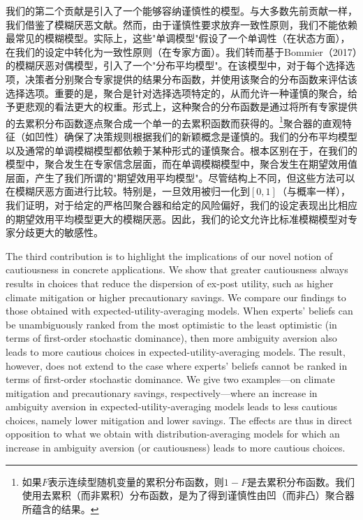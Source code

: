 \documentclass[12pt,a4paper]{article}
\newenvironment{original}
  {\par\noindent\ignorespaces}
  {\par}
\newenvironment{translation}
  {\par\noindent{\color{transblue}\ignorespaces}}
  {\par\medskip}
\begin{document}
\begin{translation}
我们的第二个贡献是引入了一个能够容纳谨慎性的模型。与大多数先前贡献一样，我们借鉴了模糊厌恶文献。然而，由于谨慎性要求放弃一致性原则，我们不能依赖最常见的模糊模型。实际上，这些"单调模型"假设了一个单调性（在状态方面），在我们的设定中转化为一致性原则（在专家方面）。我们转而基于Bommier（2017）的模糊厌恶对偶模型，引入了一个"分布平均模型"。在该模型中，对于每个选择选项，决策者分别聚合专家提供的结果分布函数，并使用该聚合的分布函数来评估该选择选项。重要的是，聚合是针对选择选项特定的，从而允许一种谨慎的聚合，给予更悲观的看法更大的权重。形式上，这种聚合的分布函数是通过将所有专家提供的去累积分布函数逐点聚合成一个单一的去累积函数而获得的。\footnote{如果$F$表示连续型随机变量的累积分布函数，则$1-F$是去累积分布函数。我们使用去累积（而非累积）分布函数，是为了得到谨慎性由凹（而非凸）聚合器所蕴含的结果。}聚合器的直观特征（如凹性）确保了决策规则根据我们的新颖概念是谨慎的。我们的分布平均模型以及通常的单调模糊模型都依赖于某种形式的谨慎聚合。根本区别在于，在我们的模型中，聚合发生在专家信念层面，而在单调模糊模型中，聚合发生在期望效用值层面，产生了我们所谓的"期望效用平均模型"。尽管结构上不同，但这些方法可以在模糊厌恶方面进行比较。特别是，一旦效用被归一化到$[0,1]$（与概率一样），我们证明，对于给定的严格凹聚合器和给定的风险偏好，我们的设定表现出比相应的期望效用平均模型更大的模糊厌恶。因此，我们的论文允许比标准模糊模型对专家分歧更大的敏感性。
\end{translation}

\begin{original}
The third contribution is to highlight the implications of our novel notion of cautiousness in concrete applications. We show that greater cautiousness always results in choices that reduce the dispersion of ex-post utility, such as higher climate mitigation or higher precautionary savings. We compare our findings to those obtained with expected-utility-averaging models. When experts' beliefs can be unambiguously ranked from the most optimistic to the least optimistic (in terms of first-order stochastic dominance), then more ambiguity aversion also leads to more cautious choices in expected-utility-averaging models. The result, however, does not extend to the case where experts' beliefs cannot be ranked in terms of first-order stochastic dominance. We give two examples---on climate mitigation and precautionary savings, respectively---where an increase in ambiguity aversion in expected-utility-averaging models leads to less cautious choices, namely lower mitigation and lower savings. The effects are thus in direct opposition to what we obtain with distribution-averaging models for which an increase in ambiguity aversion (or cautiousness) leads to more cautious choices.
\end{original}
\end{document}
